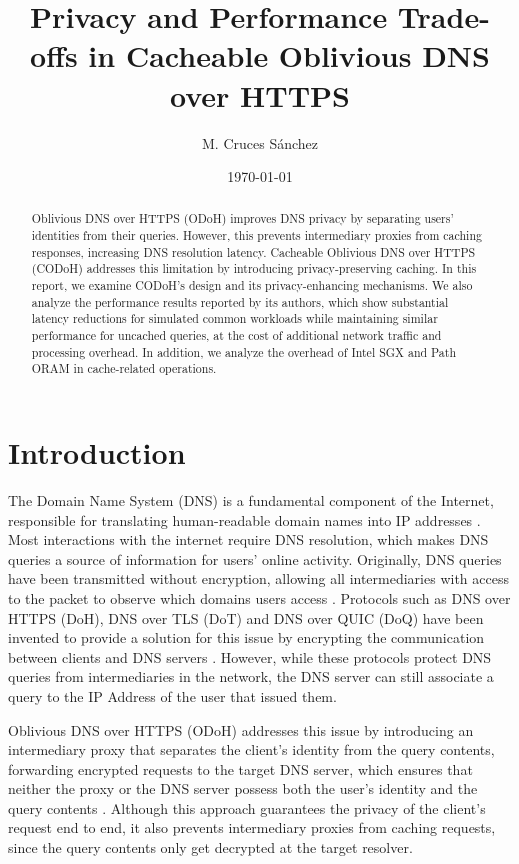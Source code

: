 \documentclass[a4paper]{article}
\author{M. Cruces Sánchez}
\title{Privacy and Performance Trade-offs in Cacheable Oblivious DNS over HTTPS}
\date{\today}
\begin{document}
\maketitle

\begin{abstract}
  Oblivious DNS over HTTPS (ODoH) improves DNS privacy by separating users' identities from their queries. However, this prevents intermediary proxies from caching responses, increasing DNS resolution latency. Cacheable Oblivious DNS over HTTPS (CODoH) addresses this limitation by introducing privacy-preserving caching. In this report, we examine CODoH's design and its privacy-enhancing mechanisms. We also analyze the performance results reported by its authors, which show substantial latency reductions for simulated common workloads while maintaining similar performance for uncached queries, at the cost of additional network traffic and processing overhead. In addition, we analyze the overhead of Intel SGX and Path ORAM in cache-related operations.
\end{abstract}

\section{Introduction}
\label{sec:intro}
The Domain Name System (DNS) is a fundamental component of the Internet, responsible for translating human-readable domain names into IP addresses \citep{rfc1034}. Most interactions with the internet require DNS resolution, which makes DNS queries a source of information for users' online activity. Originally, DNS queries have been transmitted without encryption, allowing all intermediaries with access to the packet to observe which domains users access \citep{rfc9076}. Protocols such as DNS over HTTPS (DoH), DNS over TLS (DoT) and DNS over QUIC (DoQ) have been invented to provide a solution for this issue by encrypting the communication between clients and DNS servers \citep{rfc8484,rfc7858,rfc9250}. However, while these protocols protect DNS queries from intermediaries in the network, the DNS server can still associate a query to the IP Address of the user that issued them.

Oblivious DNS over HTTPS (ODoH) addresses this issue by introducing an intermediary proxy that separates the client's identity from the query contents, forwarding encrypted requests to the target DNS server, which ensures that neither the proxy or the DNS server possess both the user's identity and the query contents \citep{singanamalla2020oblivious,rfc9230}. Although this approach guarantees the privacy of the client's request end to end, it also prevents intermediary proxies from caching requests, since the query contents only get decrypted at the target resolver.
\end{document}
